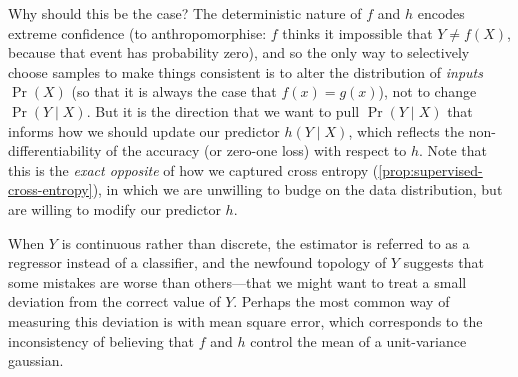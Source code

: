 \documentclass[twoside]{article}
\theoremstyle{plain}
\newtheorem{prop}[theorem]{Proposition}
\theoremstyle{definition}
\begin{document}
Why should this be the case? The deterministic nature of $f$ and $h$ encodes extreme confidence (to anthropomorphise: $f$ thinks it impossible that $Y \ne f(X)$, because that event has probability zero), and so the only way to selectively choose samples to make things consistent is to alter the distribution of \emph{inputs} $\Pr(X)$ (so that it is always the case that $f(x) = g(x)$), not to change $\Pr(Y \mid X)$.
But it is the direction that we want to pull $\Pr(Y\mid X)$ that informs how we should update our predictor $h(Y \mid X)$, which reflects the non-differentiability of the accuracy (or zero-one loss) with respect to $h$.
Note that this is the \emph{exact opposite} of how we captured cross entropy (\cref{prop:supervised-cross-entropy}), in which we are unwilling to budge on the data distribution, but are willing to modify our predictor $h$.





When $Y$ is continuous rather than discrete, the estimator is referred to as a regressor instead of a classifier, and the newfound topology of $Y$ suggests that some mistakes are worse than others---that we might want to treat a small deviation from the correct value of $Y$.
Perhaps the most common way of measuring this deviation is with mean square error, which corresponds to the inconsistency of believing that $f$ and $h$ control the mean of a unit-variance gaussian.
\end{document}
